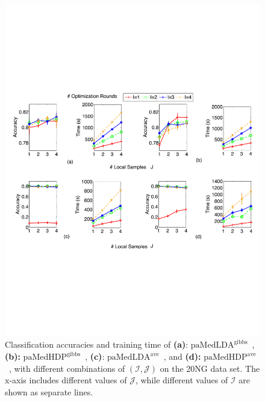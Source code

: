\documentclass[twoside,11pt]{article}
\newcommand\paMedLDAave{$\text{paMedLDA}^{\text{ave}}$~}
\newcommand\paMedLDAgibbs{$\text{paMedLDA}^{\text{gibbs}}$~}
\newcommand\paMedHDPave{$\text{paMedHDP}^{\text{ave}}$~}
\newcommand\paMedHDPgibbs{$\text{paMedHDP}^{\text{gibbs}}$~}
\begin{document}
\begin{figure}[t]
\includegraphics[width = \textwidth]{plot_ij.pdf}
\caption{Classification accuracies and training time of \textbf{(a)}: \paMedLDAgibbs, \textbf{(b):} \paMedHDPgibbs, \textbf{(c)}: \paMedLDAave, and \textbf{(d):} \paMedHDPave, with different combinations of $(\mathcal{I}, \mathcal{J})$ on the 20NG data set. The x-axis includes different values of $\mathcal{J}$, while different values of $\mathcal{I}$ are shown as separate lines. }
\label{fg:multic_IJ}
\end{figure}
\end{document}
